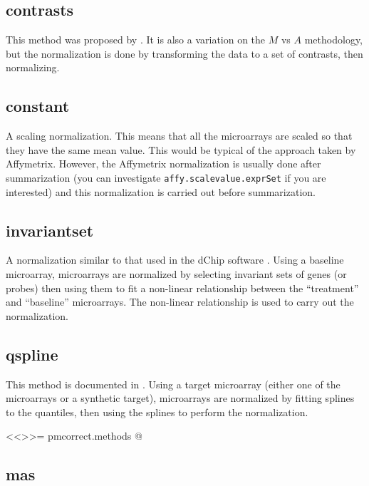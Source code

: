 \subsection{contrasts}

This method was proposed by \cite{astr:2003}. It is also a variation on the  $M$ vs $A$ methodology, but the normalization is done by transforming the data to a set of contrasts, then normalizing.

\subsection{constant}

A scaling normalization. This means that all the microarrays are scaled so that they have the same mean value. This would be typical of the approach taken by Affymetrix. However, the Affymetrix normalization is usually done after summarization (you can investigate \verb+affy.scalevalue.exprSet+ if you are interested) and this normalization is carried out before summarization.

\subsection{invariantset}

A normalization similar to that used in the dChip software \cite{PMID_11134512,PMID_11532216}. Using a baseline microarray, microarrays are normalized by selecting invariant sets of genes (or probes) then using them to fit a non-linear relationship between the ``treatment'' and ``baseline'' microarrays. The non-linear relationship is used to carry out the normalization.

\subsection{qspline}
This method is documented in \cite{workman:etal:2002}. Using a target microarray (either one of the microarrays or a synthetic target), microarrays are normalized by fitting splines to the quantiles, then using the splines to perform the normalization.

<<>>=
pmcorrect.methods
@
\subsection{mas}

